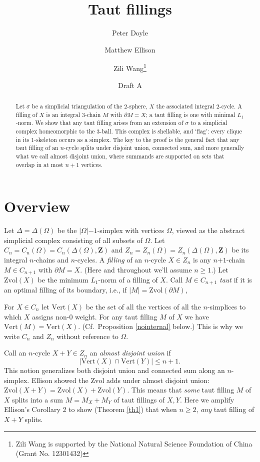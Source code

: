 \documentclass[12pt]{article}
\title{Taut fillings}
\author{Peter Doyle \and Matthew Ellison \and Zili Wang\thanks{
Zili Wang is supported by
the National Natural Science Foundation of China (Grant No. 12301432)
}}
\date{Draft A}
\def\ZZ{\mathbf{Z}}
\def\del{\partial}
\newcommand{\kw}{\mathrm}
\newcommand{\vertices}{\kw{Vert}}
\newcommand{\Zvol}{\kw{Zvol}}
\newcommand{\pls}{\mathord{+}}
\newcommand{\mns}{\mathord{-}}
\begin{document}
\maketitle

\begin{abstract}
Let $\sigma$ be a simplicial triangulation of the 2-sphere,
$X$ the associated integral 2-cycle.
A filling of $X$ is an integral 3-chain $M$
with $\del M = X$;
a taut filling is one with minimal $L_1$-norm.
We show that any taut filling 
arises from an extension of $\sigma$ to
a simplicial complex homeomorphic to the 3-ball.
This complex is shellable, and `flag':
every clique in its 1-skeleton occurs as a simplex.
The key to the proof is the general
fact that any taut filling of an $n$-cycle
splits under disjoint union, connected sum, and more generally
what we call almost disjoint union,
where summands are supported on sets that overlap in at most $n+1$ vertices.

\end{abstract}

\section{Overview}
Let $\Delta = \Delta(\Omega)$ be the $|\Omega|\mns 1$-simplex
with vertices $\Omega$,
viewed as the abstract simplicial complex consisting of all subsets of
$\Omega$.
Let $C_n=C_n(\Omega)=C_n(\Delta(\Omega),\ZZ)$
and $Z_n=Z_n(\Omega)=Z_n(\Delta(\Omega),\ZZ)$
be its integral $n$-chains and $n$-cycles.
A \emph{filling} of an $n$-cycle $X \in Z_n$ is any
$n\pls 1$-chain $M \in C_{n+1}$ with $\del M = X$.
(Here and throughout we'll assume $n\geq 1$.)
Let $\Zvol(X)$ be the minimum $L_1$-norm of a filling of $X$.
Call $M \in C_{n+1}$ \emph{taut} if it is an optimal filling
of its boundary, i.e., if $|M|=\Zvol(\del M)$,

For $X \in C_n$ let
$\vertices(X)$ be the set of all the vertices of all the $n$-simplices
to which $X$ assigns non-$0$ weight.
For any taut filling $M$ of $X$ we have $\vertices(M) = \vertices(X)$.
(Cf.\ Proposition \ref{nointernal} below.)
This is why we write $C_n$ and $Z_n$ without reference to $\Omega$.

Call an $n$-cycle $X+Y \in Z_n$ an \emph{almost disjoint union} if
\[
|\vertices(X) \cap \vertices(Y)| \leq n+1
.
\]
This notion generalizes both disjoint union and connected sum
along an $n$-simplex.
Ellison \cite{ellison:gap}
showed the $\Zvol$ adds under almost disjoint union:
$\Zvol(X+Y) = \Zvol(X) + \Zvol(Y)$.
This means that \emph{some} taut filling $M$ of $X$ splits into a sum
$M=M_X+M_Y$ of taut fillings of $X,Y$.
Here we amplify Ellison's Corollary 2 to show (Theorem \ref{th1})
that when $n \geq 2$, \emph{any} taut filling of $X+Y$ splits.
\end{document}

